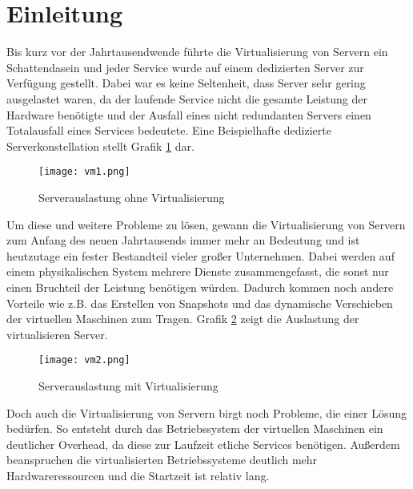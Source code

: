 \section{Einleitung}
\label{sec:Einleitung}
Bis kurz vor der Jahrtausendwende führte die Virtualisierung von Servern ein Schattendasein und jeder Service wurde auf einem dedizierten Server zur Verfügung gestellt.
Dabei war es keine Seltenheit, dass Server sehr gering ausgelastet waren, da der laufende Service nicht die gesamte Leistung der Hardware benötigte und der Ausfall eines nicht redundanten Servers einen Totalausfall eines Services bedeutete.
Eine Beispielhafte dedizierte Serverkonstellation stellt Grafik \ref{fig:HW1} dar.
\begin{figure}[H]
	\begin{center}
		\texttt{[image: vm1.png]}
	\end{center}
	\caption[Serverauslastung ohne Virtualisierung]{Serverauslastung ohne Virtualisierung \footnotemark}
	\label{fig:HW1}
\end{figure}
\newpage
Um diese und weitere Probleme zu lösen, gewann die Virtualisierung von Servern zum Anfang des neuen Jahrtausends immer mehr an Bedeutung und ist heutzutage ein fester Bestandteil vieler großer Unternehmen.
Dabei werden auf einem physikalischen System mehrere Dienste zusammengefasst, die sonst nur einen Bruchteil der Leistung benötigen würden.
Dadurch kommen noch andere Vorteile wie z.B. das Erstellen von Snapshots und das dynamische Verschieben der virtuellen Maschinen zum Tragen.
Grafik \ref{fig:HW2} zeigt die Auslastung der virtualisieren Server.
\begin{figure}[H]
	\begin{center}
		\texttt{[image: vm2.png]}
	\end{center}
	\caption[Serverauslastung mit Virtualisierung]{Serverauslastung mit Virtualisierung \footnotemark}
	\label{fig:HW2}
\end{figure}
\newpage
Doch auch die Virtualisierung von Servern birgt noch Probleme, die einer Lösung bedürfen.
So entsteht durch das Betriebssystem der virtuellen Maschinen ein deutlicher Overhead, da diese zur Laufzeit etliche Services benötigen.
Außerdem beanspruchen die virtualisierten Betriebssysteme deutlich mehr Hardwareressourcen und die Startzeit ist relativ lang.
